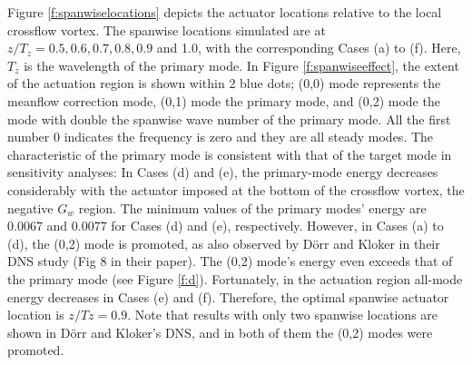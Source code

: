 Figure \ref{f:spanwiselocations} depicts the actuator locations relative to the local crossflow vortex. The spanwise locations simulated are at $z/T_z = 0.5, 0.6, 0.7, 0.8, 0.9$ and 1.0, with the corresponding Cases (a) to (f). Here, $T_z$ is the wavelength of the primary mode. In Figure \ref{f:spanwiseeffect}, the extent of the actuation region is shown within 2 blue dots; (0,0) mode represents the meanflow correction mode, (0,1) mode the primary mode, and (0,2) mode the mode with double the spanwise wave number of the primary mode. All the first number 0 indicates the frequency is zero and they are all steady modes. The characteristic of the primary mode is consistent with that of the target mode in sensitivity analyses: In Cases (d) and (e), the primary-mode energy decreases considerably with the actuator imposed at the bottom of the crossflow vortex, the negative $G_w$ region. The minimum values of the primary modes' energy are 0.0067 and 0.0077 for Cases (d) and (e), respectively. However, in Cases (a) to (d), the (0,2) mode is promoted, as also observed by D\"orr and Kloker in their DNS study \cite{dorr2016} (Fig 8 in their paper). The (0,2) mode's energy even exceeds that of the primary mode (see Figure \ref{f:d}). Fortunately, in the actuation region all-mode energy decreases in Cases (e) and (f). Therefore, the optimal spanwise actuator location is $z/Tz=0.9$. Note that results with only two spanwise locations are shown in D\"orr and Kloker's DNS\cite{dorr2016}, and in both of them the (0,2) modes were promoted.

